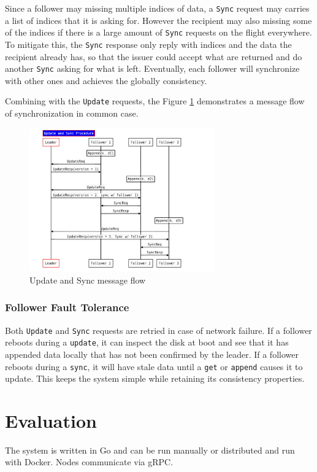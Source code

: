\documentclass[11pt,english,twocolumn]{article}
\begin{document}
Since a follower may missing multiple indices of data, a \texttt{Sync} request may carries a list of indices that it is asking for. However the recipient may also missing some of the indices if there is a large amount of \texttt{Sync} requests on the flight everywhere. To mitigate this, the \texttt{Sync} response only reply with indices and the data the recipient already has, so that the issuer could accept what are returned and do another \texttt{Sync} asking for what is left. Eventually, each follower will synchronize with  other ones and achieves the globally consistency.

Combining with the \texttt{Update} requests, the Figure \ref{UpdateAndSync} demonstrates a message flow of synchronization in common case.

\begin{figure}[h]
\includegraphics[width=8cm]{figure/UpdateAndSync.pdf}
\caption{Update and Sync message flow}
\label{UpdateAndSync}
\end{figure}

\subsubsection{Follower Fault Tolerance}
Both \texttt{Update} and \texttt{Sync} requests are retried in case of network
failure. If a follower reboots during a \texttt{update}, it can inspect the disk
at boot and see that it has appended data locally that has not been confirmed by
the leader. If a follower reboots during a \texttt{sync}, it will have stale
data until a \texttt{get} or \texttt{append} causes it to update. This keeps the
system simple while retaining its consistency properties.

\vspace{-0.4cm}
\section{Evaluation}
The system is written in Go and can be run manually or distributed and
run with Docker. Nodes communicate via gRPC. 
\end{document}
